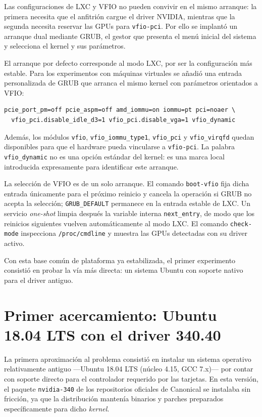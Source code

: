 Las configuraciones de LXC y VFIO no pueden convivir en el mismo arranque: la primera necesita que el anfitrión cargue el driver NVIDIA, mientras que la segunda necesita reservar las GPUs para \texttt{vfio-pci}. Por ello se implantó un arranque dual mediante GRUB, el gestor que presenta el menú inicial del sistema y selecciona el kernel y sus parámetros.

El arranque por defecto corresponde al modo LXC, por ser la configuración más estable. Para los experimentos con máquinas virtuales se añadió una entrada personalizada de GRUB que arranca el mismo kernel con parámetros orientados a VFIO:

\begin{lstlisting}[style=bash]
pcie_port_pm=off pcie_aspm=off amd_iommu=on iommu=pt pci=noaer \
  vfio_pci.disable_idle_d3=1 vfio_pci.disable_vga=1 vfio_dynamic
\end{lstlisting}

Además, los módulos \texttt{vfio}, \texttt{vfio\_iommu\_type1}, \texttt{vfio\_pci} y \texttt{vfio\_virqfd} quedan disponibles para que el hardware pueda vincularse a \texttt{vfio-pci}. La palabra \texttt{vfio\_dynamic} no es una opción estándar del kernel: es una marca local introducida expresamente para identificar este arranque.

La selección de VFIO es de un solo arranque. El comando \texttt{boot-vfio} fija dicha entrada únicamente para el próximo reinicio y cancela la operación si GRUB no acepta la selección; \texttt{GRUB\_DEFAULT} permanece en la entrada estable de LXC. Un servicio \textit{one-shot} limpia después la variable interna \texttt{next\_entry}, de modo que los reinicios siguientes vuelven automáticamente al modo LXC. El comando \texttt{check-mode} inspecciona \texttt{/proc/cmdline} y muestra las GPUs detectadas con su driver activo.

Con esta base común de plataforma ya estabilizada, el primer experimento consistió en probar la vía más directa: un sistema Ubuntu con soporte nativo para el driver antiguo.

\section{Primer acercamiento: Ubuntu 18.04 LTS con el driver 340.40}

La primera aproximación al problema consistió en instalar un sistema operativo relativamente 
antiguo ---Ubuntu 18.04 LTS (núcleo 4.15, GCC 7.x)--- por contar con soporte directo para el 
controlador requerido por las tarjetas. En esta versión, el paquete \texttt{nvidia-340} de los 
repositorios oficiales de Canonical se instalaba sin fricción, ya que la distribución mantenía 
binarios y parches preparados específicamente para dicho \textit{kernel}.

